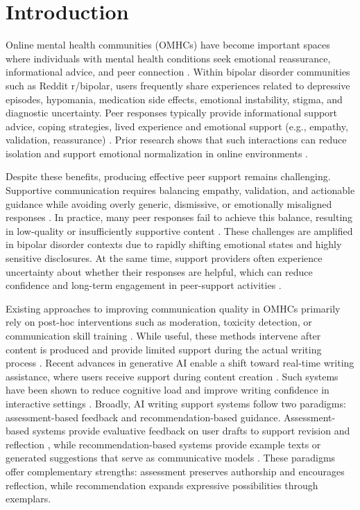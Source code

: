 \documentclass[]{llncs}
\begin{document}
\section{Introduction}

Online mental health communities (OMHCs) have become important spaces where individuals with mental health conditions seek emotional reassurance, informational advice, and peer connection \cite{Naslund2016,DeChoudhury2020,Naslund2020}. Within bipolar disorder communities such as Reddit r/bipolar, users frequently share experiences related to depressive episodes, hypomania, medication side effects, emotional instability, stigma, and diagnostic uncertainty. Peer responses typically provide informational support advice, coping strategies, lived experience and emotional support (e.g., empathy, validation, reassurance) \cite{Schaefer1981,Wang2012}. Prior research shows that such interactions can reduce isolation and support emotional normalization in online environments \cite{Barney2011,Li2016,Naslund2020}.

Despite these benefits, producing effective peer support remains challenging. Supportive communication requires balancing empathy, validation, and actionable guidance while avoiding overly generic, dismissive, or emotionally misaligned responses \cite{Cutrona1990,Li2016,OLeary2017}. In practice, many peer responses fail to achieve this balance, resulting in low-quality or insufficiently supportive content \cite{Feuston2019}. These challenges are amplified in bipolar disorder contexts due to rapidly shifting emotional states and highly sensitive disclosures. At the same time, support providers often experience uncertainty about whether their responses are helpful, which can reduce confidence and long-term engagement in peer-support activities \cite{Bracke2008}.

Existing approaches to improving communication quality in OMHCs primarily rely on post-hoc interventions such as moderation, toxicity detection, or communication skill training \cite{Chancellor2017,Feuston2019}. While useful, these methods intervene after content is produced and provide limited support during the actual writing process \cite{Andersson2014,Doherty2012}. Recent advances in generative AI enable a shift toward real-time writing assistance, where users receive support during content creation \cite{Weisz2023,Yang2024CHI}. Such systems have been shown to reduce cognitive load and improve writing confidence in interactive settings \cite{Hui2018,Gero2019}. Broadly, AI writing support systems follow two paradigms: assessment-based feedback and recommendation-based guidance. Assessment-based systems provide evaluative feedback on user drafts to support revision and reflection \cite{Hattie2007,Peng2020}, while recommendation-based systems provide example texts or generated suggestions that serve as communicative models \cite{Kim2019,Gero2019}. These paradigms offer complementary strengths: assessment preserves authorship and encourages reflection, while recommendation expands expressive possibilities through exemplars.
\end{document}
